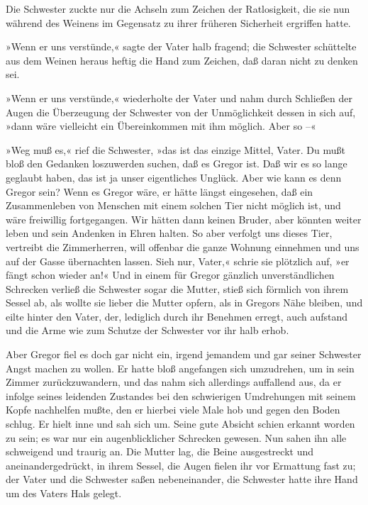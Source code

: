 Die Schwester zuckte nur die Achseln zum Zeichen der Ratlosigkeit, die
sie nun während des Weinens im Gegensatz zu ihrer früheren Sicherheit
ergriffen hatte.

»Wenn er uns verstünde,« sagte der Vater halb fragend; die Schwester
schüttelte aus dem Weinen heraus heftig die Hand zum Zeichen, daß daran
nicht zu denken sei.

»Wenn er uns verstünde,« wiederholte der Vater und nahm durch Schließen
der Augen die Überzeugung der Schwester von der Unmöglichkeit dessen in
sich auf, »dann wäre vielleicht ein Übereinkommen mit ihm möglich. Aber
so --«

»Weg muß es,« rief die Schwester, »das ist das einzige Mittel, Vater. Du
mußt bloß den Gedanken loszuwerden suchen, daß es Gregor ist. Daß wir es
so lange geglaubt haben, das ist ja unser eigentliches Unglück. Aber wie
kann es denn Gregor sein? Wenn es Gregor wäre, er hätte längst
eingesehen, daß ein Zusammenleben von Menschen mit einem solchen Tier
nicht möglich ist, und wäre freiwillig fortgegangen. Wir hätten dann
keinen Bruder, aber könnten weiter leben und sein Andenken in Ehren
halten. So aber verfolgt uns dieses Tier, vertreibt die Zimmerherren,
will offenbar die ganze Wohnung einnehmen und uns auf der Gasse
übernachten lassen. Sieh nur, Vater,« schrie sie plötzlich auf, »er
fängt schon wieder an!« Und in einem für Gregor gänzlich
unverständlichen Schrecken verließ die Schwester sogar die Mutter, stieß
sich förmlich von ihrem Sessel ab, als wollte sie lieber die Mutter
opfern, als in Gregors Nähe bleiben, und eilte hinter den Vater, der,
lediglich durch ihr Benehmen erregt, auch aufstand und die Arme wie zum
Schutze der Schwester vor ihr halb erhob.

Aber Gregor fiel es doch gar nicht ein, irgend jemandem und gar seiner
Schwester Angst machen zu wollen. Er hatte bloß angefangen sich
umzudrehen, um in sein Zimmer zurückzuwandern, und das nahm sich
allerdings auffallend aus, da er infolge seines leidenden Zustandes bei
den schwierigen Umdrehungen mit seinem Kopfe nachhelfen mußte, den er
hierbei viele Male hob und gegen den Boden schlug. Er hielt inne und sah
sich um. Seine gute Absicht schien erkannt worden zu sein; es war nur
ein augenblicklicher Schrecken gewesen. Nun sahen ihn alle schweigend
und traurig an. Die Mutter lag, die Beine ausgestreckt und
aneinandergedrückt, in ihrem Sessel, die Augen fielen ihr vor Ermattung
fast zu; der Vater und die Schwester saßen nebeneinander, die Schwester
hatte ihre Hand um des Vaters Hals gelegt.

